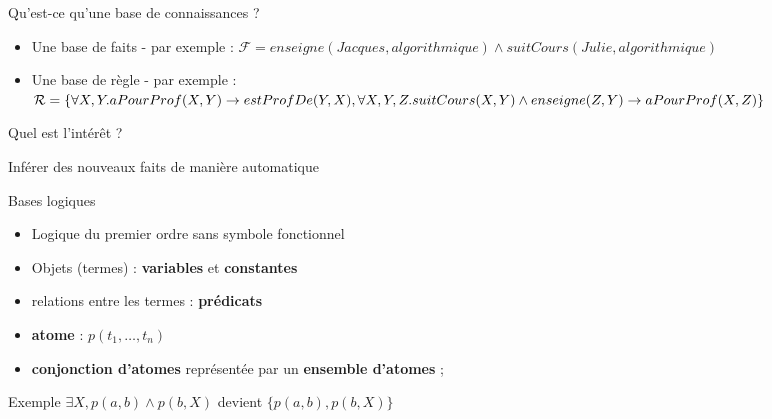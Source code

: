 \begin{frame}{Qu'est-ce qu'une base de connaissances ?}
    \begin{itemize}
        \item<1-> Une base de faits - par exemple : $\mathcal{F} = enseigne(Jacques, algorithmique) \land suitCours(Julie, algorithmique)$
        \item<2-> Une base de règle - par exemple : $\mathcal{R} = \{\forall X,Y. aPourProf(X,Y) \rightarrow estProfDe(Y,X),\linebreak \forall X,Y,Z.suitCours(X,Y) \land enseigne(Z,Y) \rightarrow aPourProf(X,Z) \}$
    \end{itemize}
\end{frame}

\begin{frame}{Quel est l'intérêt ?}
    \begin{block}{Inférer des nouveaux faits de manière automatique}
         
    \end{block}
\end{frame}

\begin{frame}{Bases logiques}
    \begin{itemize}
        \item Logique du premier ordre sans symbole fonctionnel 
        \item Objets (termes) : \textbf{variables} et \textbf{constantes} 
        \item relations entre les termes : \textbf{prédicats} 
        \item \textbf{atome} : $p(t_1,\ldots,t_n)$
        \item \textbf{conjonction d'atomes} représentée par un \textbf{ensemble d'atomes} ;
    \end{itemize}
    
    \begin{block}{Exemple}
        $\exists X, p(a,b) \land p(b,X)$ devient $\{p(a,b),p(b,X)\}$
    \end{block}
\end{frame}

